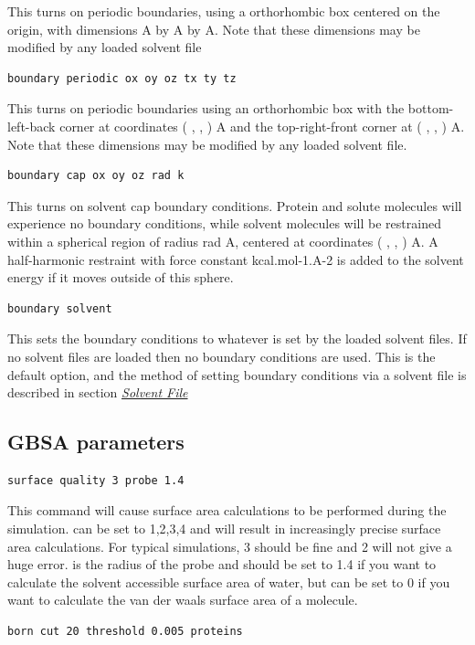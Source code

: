 \documentclass[letterpaper,10pt,english]{manual}
\begin{document}
This turns on periodic boundaries, using a orthorhombic box centered on the origin, with dimensions  A by  A by  A. Note that these dimensions may be modified by any loaded solvent file

\begin{Verbatim}[commandchars=@\[\]]
boundary periodic ox oy oz tx ty tz
\end{Verbatim}

This turns on periodic boundaries using an orthorhombic box with the bottom-left-back corner at coordinates ( ,  , ) A and the top-right-front corner at ( ,  , ) A. Note that these dimensions may be modified by any loaded solvent file.

\begin{Verbatim}[commandchars=@\[\]]
boundary cap ox oy oz rad k
\end{Verbatim}

This turns on solvent cap boundary conditions. Protein and solute molecules will experience no boundary conditions, while solvent molecules will be restrained within a spherical region of radius rad A, centered at coordinates ( ,  , ) A. A half-harmonic restraint with force constant  kcal.mol-1.A-2 is added to the solvent energy if it moves outside of this sphere.

\begin{Verbatim}[commandchars=@\[\]]
boundary solvent
\end{Verbatim}

This sets the boundary conditions to whatever is set by the loaded solvent files. If no solvent files are loaded then no boundary conditions are used. This is the default option, and the method of setting boundary conditions via a solvent file is described in section \hyperlink{solventpdb}{\emph{Solvent File}}


\subsection{GBSA parameters}
\begin{Verbatim}[commandchars=@\[\]]
surface quality 3 probe 1.4
\end{Verbatim}

This command will cause surface area calculations to be performed during the simulation.  can be set to 1,2,3,4 and will result in increasingly precise surface area calculations. For typical simulations, 3 should be fine and 2 will not give a huge error.  is the radius of the probe and should be set to 1.4 if you want to calculate the solvent accessible surface area of water, but can be set to 0 if you want to calculate the van der waals surface area of a molecule.
\begin{Verbatim}[commandchars=@\[\]]
born cut 20 threshold 0.005 proteins
\end{Verbatim}
\end{document}
